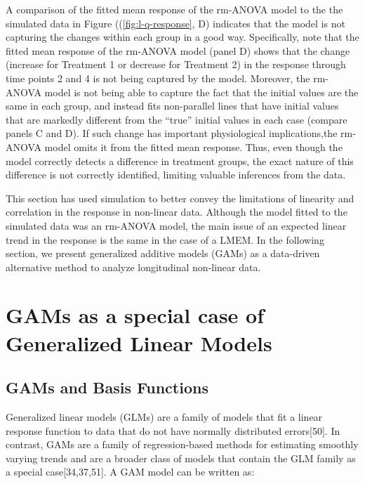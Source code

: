 \documentclass[
]{article}
\begin{document}
A comparison of the fitted mean response of the rm-ANOVA model to the the simulated data in Figure ((\ref{fig:l-q-response}, D) indicates that the model is not capturing the changes within each group in a good way. Specifically, note that the fitted mean response of the rm-ANOVA model (panel D) shows that the change (increase for Treatment 1 or decrease for Treatment 2) in the response through time points 2 and 4 is not being captured by the model. Moreover, the rm-ANOVA model is not being able to capture the fact that the initial values are the same in each group, and instead fits non-parallel lines that have initial values that are markedly different from the ``true'' initial values in each case (compare panels C and D). If such change has important physiological implications,the rm-ANOVA model omits it from the fitted mean response. Thus, even though the model correctly detects a difference in treatment groups, the exact nature of this difference is not correctly identified, limiting valuable inferences from the data.

This section has used simulation to better convey the limitations of linearity and correlation in the response in non-linear data. Although the model fitted to the simulated data was an rm-ANOVA model, the main issue of an expected linear trend in the response is the same in the case of a LMEM. In the following section, we present generalized additive models (GAMs) as a data-driven alternative method to analyze longitudinal non-linear data.

\hypertarget{gams-as-a-special-case-of-generalized-linear-models}{%
\section{GAMs as a special case of Generalized Linear Models}\label{gams-as-a-special-case-of-generalized-linear-models}}

\hypertarget{gams-and-basis-functions}{%
\subsection{GAMs and Basis Functions}\label{gams-and-basis-functions}}

Generalized linear models (GLMs) are a family of models that fit a linear response function to data that do not have normally distributed errors{[}50{]}. In contrast, GAMs are a family of regression-based methods for estimating smoothly varying trends and are a broader class of models that contain the GLM family as a special case{[}34,37,51{]}. A GAM model can be written as:
\end{document}

